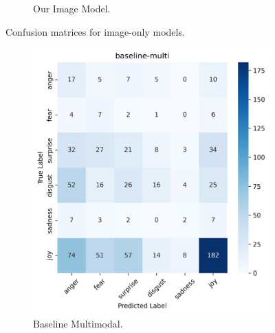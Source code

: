 \begin{figure}[ht]
\begin{subfigure}[b]{0.48\textwidth}
        \caption{Our Image Model.}
        \label{fig:image-confusion-best}
    \end{subfigure}
    \caption{Confusion matrices for image-only models.}
    \label{fig:image-confusion}
\end{figure}

\begin{figure}[ht]
    \centering
    \begin{subfigure}[b]{0.48\textwidth}
        \includegraphics[width=\textwidth]{images/confusion_matrix_baseline_multi_dist.png}
        \caption{Baseline Multimodal.}
        \label{fig:multi-confusion-baseline}
    \end{subfigure}
    \hfill
    \begin{subfigure}[b]{0.48\textwidth}

\end{subfigure}
\end{figure}

